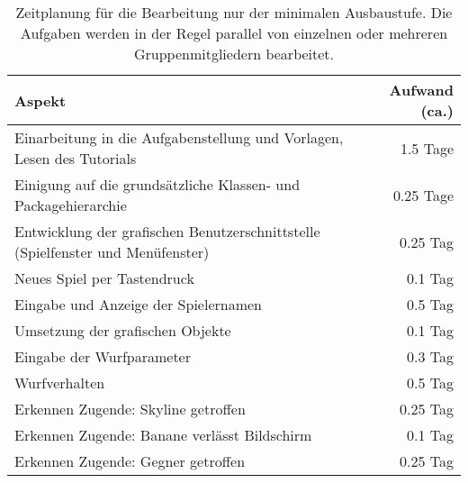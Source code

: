 \begin{table}[htb]
\begin{center}\begin{tabular}{|p{}|r|}\hline
\textbf{Aspekt} & \textbf{Aufwand (ca.)}\\\hline\hline

Einarbeitung in die Aufgabenstellung und Vorlagen, Lesen des Tutorials & 1.5 Tage\\\hline

Einigung auf die grunds\"atzliche Klassen- und Packagehierarchie & 0.25 Tage\\\hline

Entwicklung der grafischen Benutzerschnittstelle (Spielfenster und Menüfenster) & 0.25 Tag\\\hline

Neues Spiel per Tastendruck & 0.1 Tag\\\hline

Eingabe und Anzeige der Spielernamen & 0.5 Tag\\\hline

Umsetzung der grafischen Objekte & 0.1 Tag\\\hline

Eingabe der Wurfparameter & 0.3 Tag\\\hline

Wurfverhalten & 0.5 Tag \\\hline

Erkennen Zugende: Skyline getroffen & 0.25 Tag \\\hline

Erkennen Zugende: Banane verl\"asst Bildschirm & 0.1 Tag \\\hline

Erkennen Zugende: Gegner getroffen & 0.25 Tag \\\hline
\end{tabular}
\caption{Zeitplanung f\"ur die Bearbeitung \glqq{}nur\grqq{} der minimalen Ausbaustufe.
Die Aufgaben werden in der Regel parallel von einzelnen oder mehreren Gruppenmitgliedern bearbeitet.}
\label{tab:zeitplanMinimal}
\end{center}
\end{table}

